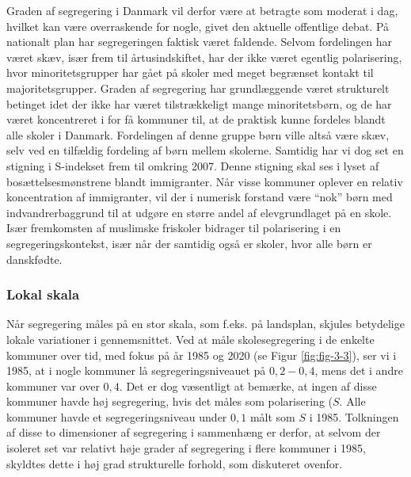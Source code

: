 \documentclass[
]{book}
\begin{document}
Graden af segregering i Danmark vil derfor være at betragte som moderat i dag, hvilket kan være overraskende for nogle, givet den aktuelle offentlige debat. På nationalt plan har segregeringen faktisk været faldende. Selvom fordelingen har været skæv, især frem til årtusindskiftet, har der ikke været egentlig polarisering, hvor minoritetsgrupper har gået på skoler med meget begrænset kontakt til majoritetsgrupper. Graden af segregering har grundlæggende været strukturelt betinget idet der ikke har været tilstrækkeligt mange minoritetsbørn, og de har været koncentreret i for få kommuner til, at de praktisk kunne fordeles blandt alle skoler i Danmark. Fordelingen af denne gruppe børn ville altså være skæv, selv ved en tilfældig fordeling af børn mellem skolerne. Samtidig har vi dog set en stigning i S-indekset frem til omkring 2007. Denne stigning skal ses i lyset af bosættelsesmønstrene blandt immigranter. Når visse kommuner oplever en relativ koncentration af immigranter, vil der i numerisk forstand være ``nok'' børn med indvandrerbaggrund til at udgøre en større andel af elevgrundlaget på en skole. Især fremkomsten af muslimske friskoler bidrager til polarisering i en segregeringskontekst, især når der samtidig også er skoler, hvor alle børn er danskfødte.

\hypertarget{lokal-skala}{%
\subsubsection{Lokal skala}\label{lokal-skala}}

Når segregering måles på en stor skala, som f.eks. på landsplan, skjules betydelige lokale variationer i gennemsnittet. Ved at måle skolesegregering i de enkelte kommuner over tid, med fokus på år 1985 og 2020 (se Figur \ref{fig:fig-3-3}), ser vi i 1985, at i nogle kommuner lå segregeringsniveauet på \(0,2-0,4\), mens det i andre kommuner var over \(0,4\). Det er dog væsentligt at bemærke, at ingen af disse kommuner havde høj segregering, hvis det måles som polarisering (\(S\). Alle kommuner havde et segregeringsniveau under \(0,1\) målt som \(S\) i 1985. Tolkningen af disse to dimensioner af segregering i sammenhæng er derfor, at selvom der isoleret set var relativt høje grader af segregering i flere kommuner i 1985, skyldtes dette i høj grad strukturelle forhold, som diskuteret ovenfor.
\end{document}
